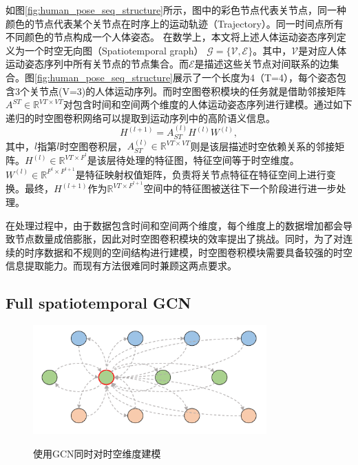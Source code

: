 如图\ref{fig:human_pose_seq_structure}所示，图中的彩色节点代表关节点，同一种颜色的节点代表某个关节点在时序上的运动轨迹（Trajectory）。同一时间点所有不同颜色的节点构成一个人体姿态。
在数学上，本文将上述人体运动姿态序列定义为一个时空无向图（Spatiotemporal graph） $\mathcal{G} = \{\mathcal{V,E}\}$。其中，$\mathcal{V}$是对应人体运动姿态序列中所有关节点的节点集合。而$\mathcal{E}$是描述这些关节点对间联系的边集合。图\ref{fig:human_pose_seq_structure}展示了一个长度为4（T=4），每个姿态包含3个关节点(V=3)的人体运动序列。而时空图卷积模块的任务就是借助邻接矩阵${A}^{ST} \in \mathbb{R}^{VT\times VT}$对包含时间和空间两个维度的人体运动姿态序列进行建模。通过如下递归的时空图卷积网络可以提取到运动序列中的高阶语义信息。
\begin{equation}
    {H}^{(l+1)}= {A}_{ST}^{(l)}{H}^{(l)}{W}^{(l)},
    \label{equation:graph-conv}
\end{equation}
其中，$l$指第$l$时空图卷积层，${A}_{ST}^{(l)}\in \mathbb{R}^{VT\times VT}$则是该层描述时空依赖关系的邻接矩阵。${H}^{(l)}\in \mathbb{R}^{VT\times F^l}$是该层待处理的特征图，特征空间等于时空维度。${W}^{(l)}\in \mathbb{R}^{F^l\times F^{l+1}}$是特征映射权值矩阵，负责将关节点特征在特征空间上进行变换。最终，${H}^{(l+1)}$作为$\mathbb{R}^{VT\times F^{l+1}}$空间中的特征图被送往下一个阶段进行进一步处理。

在处理过程中，由于数据包含时间和空间两个维度，每个维度上的数据增加都会导致节点数量成倍膨胀，因此对时空图卷积模块的效率提出了挑战。同时，为了对连续的时序数据和不规则的空间结构进行建模，时空图卷积模块需要具备较强的时空信息提取能力。而现有方法很难同时兼顾这两点要求。

\subsection{Full spatiotemporal GCN}
\begin{figure}[ht]
    \centering
    \includegraphics[width=0.80\textwidth]{FigMa/original_gcn.png}\\
    \vspace{-0.3cm}
    \caption{使用GCN同时对时空维度建模}
    \label{fig:original_gcn_structure}
\end{figure}

